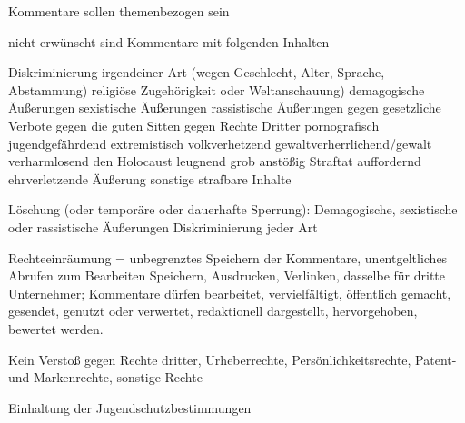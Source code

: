 Kommentare sollen themenbezogen sein

nicht erwünscht sind Kommentare mit folgenden Inhalten

Diskriminierung irgendeiner Art (wegen Geschlecht, Alter, Sprache, Abstammung) religiöse Zugehörigkeit oder Weltanschauung)
demagogische Äußerungen
sexistische Äußerungen
rassistische Äußerungen 
gegen gesetzliche Verbote
gegen die guten Sitten 
gegen Rechte Dritter
pornografisch
jugendgefährdend
extremistisch
volkverhetzend
gewaltverherrlichend/gewalt verharmlosend
den Holocaust leugnend
grob anstößig
Straftat auffordernd 
ehrverletzende Äußerung
sonstige strafbare Inhalte


Löschung (oder temporäre oder dauerhafte Sperrung):
Demagogische, sexistische oder rassistische Äußerungen
Diskriminierung jeder Art




Rechteeinräumung =
unbegrenztes Speichern der Kommentare, 
unentgeltliches Abrufen zum Bearbeiten 
Speichern, Ausdrucken, Verlinken, 										dasselbe für dritte Unternehmer; 
Kommentare dürfen bearbeitet, vervielfältigt, öffentlich gemacht, gesendet, genutzt oder 	verwertet, redaktionell dargestellt, hervorgehoben, bewertet werden.


Kein Verstoß gegen Rechte dritter, Urheberrechte, Persönlichkeitsrechte, Patent- und Markenrechte, sonstige Rechte

Einhaltung der Jugendschutzbestimmungen